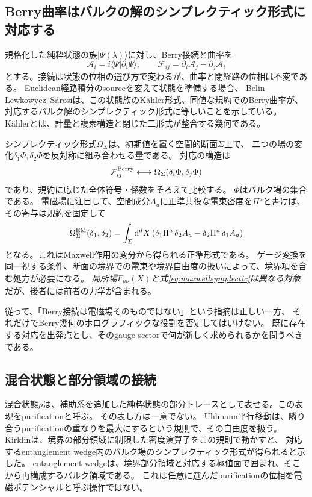 \documentclass[a4paper,11pt]{ltjsarticle}
\numberwithin{equation}{section}
\newcommand{\dd}{\mathrm d}
\newcommand{\ket}[1]{\lvert#1\rangle}
\begin{document}
\subsection{Berry曲率はバルクの解のシンプレクティック形式に対応する}
規格化した純粋状態の族$\ket{\Psi(\lambda)}$に対し、Berry接続と曲率を
\begin{equation}
 \mathcal A_i=i\langle\Psi|\partial_i\Psi\rangle,
 \qquad \mathcal F_{ij}=\partial_i\mathcal A_j-\partial_j\mathcal A_i
 \label{eq:berry}
\end{equation}
とする。接続は状態の位相の選び方で変わるが、曲率と閉経路の位相は不変である。
Euclidean経路積分のsourceを変えて状態を準備する場合、
Belin--Lewkowycz--S\'arosiは、この状態族のK\"ahler形式、同値な規約でのBerry曲率が、
対応するバルク解のシンプレクティック形式に等しいことを示している\cite{BLS}。
K\"ahlerとは、計量と複素構造と閉じた二形式が整合する幾何である。

シンプレクティック形式$\Omega_\Sigma$は、初期値を置く空間的断面$\Sigma$上で、
二つの場の変化$\delta_1\Phi,\delta_2\Phi$を反対称に組み合わせる量である。
対応の構造は
\begin{equation}
 \mathcal F^{\rm Berry}_{ij}
 \longleftrightarrow \Omega_\Sigma(\delta_i\Phi,\delta_j\Phi)
 \label{eq:symplecticdictionary}
\end{equation}
であり、規約に応じた全体符号・係数をそろえて比較する。
$\Phi$はバルク場の集合である。
電磁場に注目して、空間成分$A_a$に正準共役な電束密度を$\Pi^a$と書けば、その寄与は規約を固定して
\begin{equation}
 \Omega_{\Sigma}^{\rm EM}(\delta_1,\delta_2)
 =\int_\Sigma\dd^dX\,
 (\delta_1\Pi^a\,\delta_2A_a-\delta_2\Pi^a\,\delta_1A_a)
 \label{eq:maxwellsymplectic}
\end{equation}
となる。これはMaxwell作用の変分から得られる正準形式である。
ゲージ変換を同一視する条件、断面の境界での電束や境界自由度の扱いによって、境界項を含む処方が必要になる。
\emph{局所場$F_{\mu\nu}(X)$と式\eqref{eq:maxwellsymplectic}は異なる対象}だが、後者には前者の力学が含まれる。

従って、「Berry接続は電磁場そのものではない」という指摘は正しい一方、
それだけでBerry幾何のホログラフィックな役割を否定してはいけない。
既に存在する対応を出発点とし、そのgauge sectorで何が新しく求められるかを問うべきである。

\subsection{混合状態と部分領域の接続}
混合状態$\rho$は、補助系を追加した純粋状態の部分トレースとして表せる。この表現をpurificationと呼ぶ。
その表し方は一意でない。
Uhlmann平行移動は、隣り合うpurificationの重なりを最大にするという規則で、その自由度を扱う。
Kirklinは、境界の部分領域に制限した密度演算子をこの規則で動かすと、
対応するentanglement wedge内のバルク場のシンプレクティック形式が得られると示した\cite{Kirklin}。
entanglement wedgeは、境界部分領域と対応する極値面で囲まれ、そこから再構成するバルク領域である。
これは任意に選んだpurificationの位相を電磁ポテンシャルと呼ぶ操作ではない。
\end{document}
